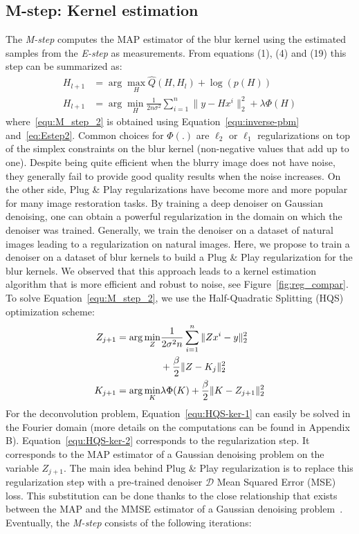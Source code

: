 \documentclass[10pt,twocolumn,letterpaper]{article}
\begin{document}
\subsection{M-step: Kernel estimation}
%
The \textit{M-step} computes the MAP estimator of the blur kernel using the estimated samples from the \textit{E-step} as measurements.
%
From equations (1), (4) and (19) this step can be summarized as:
\begin{align}
    \label{equ:M_step_1}
    H_{l+1} & = \arg\max_H \hat{Q}(H,H_l) + \log(p(H)) \\
    H_{l+1} & = \arg\min_H \frac{1}{2 n \sigma^2}\sum_{i=1}^n{\|y - H x^i\|_2^2} + \lambda \Phi(H) \label{equ:M_step_2} 
\end{align}
%
%
where~\eqref{equ:M_step_2} is obtained using Equation~\eqref{equ:inverse-pbm} and~\eqref{eq:Estep2}.
Common choices for $\Phi(.)$ are $\ell_2$ or $\ell_1$ regularizations on top of the simplex constraints on the blur kernel (non-negative values that add up to one).
%
Despite being quite efficient when the blurry image does not have noise, they generally fail to provide good quality results when the noise increases. On the other side, Plug \& Play regularizations have become more and more popular for many image restoration tasks. By training a deep denoiser on Gaussian denoising, one can obtain a powerful regularization in the domain on which the denoiser was trained. Generally, we train the denoiser on a dataset of natural images leading to a regularization on natural images. Here, we propose to train a denoiser on a dataset of blur kernels to build a Plug \& Play regularization for the blur kernels. We observed that this approach leads to a kernel estimation algorithm that is more efficient and robust to noise, see Figure~\ref{fig:reg_compar}. 
%
To solve Equation~\eqref{equ:M_step_2}, we use the Half-Quadratic Splitting (HQS) optimization scheme:
\begin{align}
\label{equ:HQS-ker-1}
    \notag
    Z_{j+1} = \arg\min_Z & \frac{1}{2\sigma^2 n}\sum_{i=1}^n{\|Z x^i -y\|_2^2} \\
    & + \frac{\beta}{2}\|Z-K_j\|_2^2 \\
\label{equ:HQS-ker-2}
    K_{j+1} = \arg\min_K & \lambda \Phi(K) + \frac{\beta}{2}\|K-Z_{j+1}\|_2^2
\end{align}
For the deconvolution problem, Equation~\eqref{equ:HQS-ker-1} can easily be solved in the Fourier domain (more details on the computations can be found in Appendix B).
%
Equation~\eqref{equ:HQS-ker-2} corresponds to the regularization step. It corresponds to the MAP estimator of a Gaussian denoising problem on the variable $Z_{j+1}$. The main idea behind Plug \& Play regularization is to replace this regularization step with a pre-trained denoiser $\mathcal{D}$ Mean Squared Error (MSE) loss. This substitution can be done thanks to the close relationship that exists between the MAP and the MMSE estimator of a Gaussian denoising problem~\cite{Gribonval2011}. Eventually, the \textit{M-step} consists of the following iterations:
\end{document}
